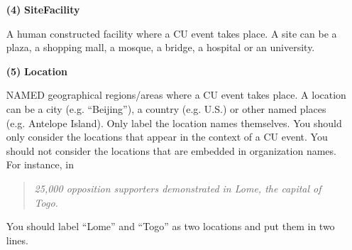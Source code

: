 \begin{enumerate}
Issues can be described as base 
noun phrases and base verb phrases, if you think parts of the essential issues 
are included in pp attachments (if any) of the base noun/verb phrases, label 
the pp attachments too, furthermore, if you think a complete clause is needed 
to describe an issue, label the full clause. 
For instance, consider
  \begin{quote}
   {\em The demonstrators protest against Spain's proposal to legalize 
 gay marriage.}
  \end{quote}
you should put ``legalize gay marriage'' as the key issue without 
 including ``Spain\'s proposal to'' because ``Spain\'s proposal to'' only signify the 
 source (Spain) and the state (being proposed) of the key issue.
 
 Another example is as follows,
  \begin{quote}
   {\em The youth of Lebanon have occupied the front line of the "Cedar Revolution" 
 gripping the country since the February 14 assassination of popular former prime 
 minister Rafiq Hariri.}
  \end{quote}
you should label ``the February 14 assassination of popular 
 former prime minister Rafiq Hariri'' as the key issue. 
 
If there are multiple references (can be 
in any of the above three forms) to the essential issue (should be only one in content 
for one event), please label all the ones that are in different lexical forms.

  


\item[{\bf (4)}] {\bf Site\/Facility}

A human constructed facility where a CU event takes place. 
A site can be a plaza, a shopping mall, a mosque, a bridge, a hospital or an university.

\item[{\bf (5)}] {\bf Location}

NAMED geographical regions/areas where a CU event takes place. 
A location can be a city (e.g. ``Beijing''), a country (e.g. U.S.) or other named places 
(e.g. Antelope Island). Only label the location names themselves. You should only 
consider the locations that appear in the context of a CU event. You should not consider 
the locations that are embedded in organization names. 
For instance, in 
  \begin{quote}
   {\em 25,000 opposition supporters demonstrated in Lome, the capital of Togo.}
  \end{quote}
 You should label ``Lome'' and ``Togo'' as two locations and put them in two lines. 


\end{enumerate}

